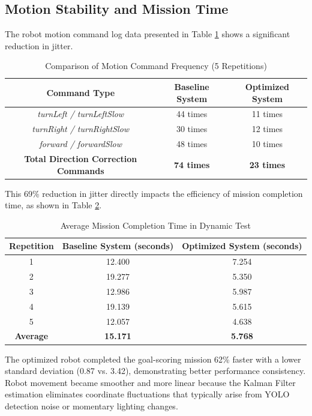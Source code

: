 \documentclass[12pt,a4paper]{article}
\begin{document}
\subsection{Motion Stability and Mission Time}
The robot motion command log data presented in Table \ref{tab:jitter} shows a significant reduction in jitter.

\begin{table}[H]
\centering
\caption{Comparison of Motion Command Frequency (5 Repetitions)}
\label{tab:jitter}
\begin{tabular}{|c|c|c|}
\hline
\textbf{Command Type} & \textbf{Baseline System} & \textbf{Optimized System} \\
\hline
\textit{turnLeft / turnLeftSlow} & 44 times & 11 times \\
\textit{turnRight / turnRightSlow} & 30 times & 12 times \\
\textit{forward / forwardSlow} & 48 times & 10 times \\
\hline
\textbf{Total Direction Correction Commands} & \textbf{74 times} & \textbf{23 times} \\
\hline
\end{tabular}
\end{table}

This 69\% reduction in jitter directly impacts the efficiency of mission completion time, as shown in Table \ref{tab:time}.

\begin{table}[H]
\centering
\caption{Average Mission Completion Time in Dynamic Test}
\label{tab:time}
\begin{tabular}{|c|c|c|}
\hline
\textbf{Repetition} & \textbf{Baseline System (seconds)} & \textbf{Optimized System (seconds)} \\
\hline
1 & 12.400 & 7.254 \\
2 & 19.277 & 5.350 \\
3 & 12.986 & 5.987 \\
4 & 19.139 & 5.615 \\
5 & 12.057 & 4.638 \\
\hline
\textbf{Average} & \textbf{15.171} & \textbf{5.768} \\
\hline
\end{tabular}
\end{table}

The optimized robot completed the goal-scoring mission 62\% faster with a lower standard deviation (0.87 vs. 3.42), demonstrating better performance consistency. Robot movement became smoother and more linear because the Kalman Filter estimation eliminates coordinate fluctuations that typically arise from YOLO detection noise or momentary lighting changes.
\end{document}
